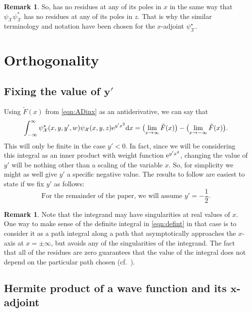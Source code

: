 \documentclass[10pt,a4paper]{amsart}
\numberwithin{equation}{section}
\theoremstyle{definition}
\newtheorem{Remark}[Theorem]{Remark}
\def\psistar{\psi^{\star}}
\def\X{\mathcal{X}}
\begin{document}
\begin{Remark}
So, \smash{$\psistar_{\X}\psi_{\X} {\rm e}^{y'x^2}$} has no residues at any of its
poles in $x$ in the same way that $\psi_{\X}\psi^*_{\X}$ has no
residues at any of its poles in $z$.
That is why the similar terminology and notation have been chosen for
the $x$-adjoint $\psistar_{\X}$.
\end{Remark}

\section{Orthogonality}\label{sec:scalarorthog}\label{sec:almostbiorthog}

\subsection[Fixing the value of y']{Fixing the value of $\boldsymbol{y'}$}

Using $\tilde F(x)$ from \eqref{eqn:ADinx} as an antiderivative, we
can say that
\begin{equation}
\int_{-\infty}^{\infty}
\psistar_{\X}(x,y,y',w) \psi_{\X}(x,y,z) {\rm e}^{y'x^2}{\rm d}x=\bigl(\lim_{x\to\infty}
\tilde F(x)\bigr)-\bigl(\lim_{x\to-\infty}\tilde F(x)\bigr).
 \label{eqn:defint}
\end{equation}
This will only be finite in the case $y'<0$. In fact, since we will
be considering this integral as an inner product with weight function
${\rm e}^{y'x^2}$, changing the value of $y'$ will be nothing other than a
scaling of the variable $x$. So, for simplicity we might as well give
$y'$ a specific negative value. The results to follow are
easiest to state if we fix $y'$ as follows:
\[
\text{For the remainder of the paper, we will assume $y'=-\frac{1}{2}$.}
\]
\begin{Remark}
 Note that the integrand may have singularities at real values of
 $x$. One way to make sense of the definite integral in
 \eqref{eqn:defint} in that case is to consider it as a path integral along
 a path that asymptotically approaches the $x$-axis at $x=\pm\infty$,
 but avoids any of the singularities of the integrand. The fact that
 all of the residues are zero guarantees that the value of the
 integral does not depend on the particular path chosen (cf.~\cite{HHV}).
\end{Remark}
\subsection[Hermite product of a wave function
 and its x-adjoint]{Hermite product of a wave function
 and its $\boldsymbol{x}$-adjoint}
\end{document}

